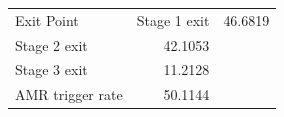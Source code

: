\begin{tabular}{lr}
\toprule
Exit Point & %
\midrule
Stage 1 exit & 46.6819 \\
Stage 2 exit & 42.1053 \\
Stage 3 exit & 11.2128 \\
AMR trigger rate & 50.1144 \\
\bottomrule
\end{tabular}
